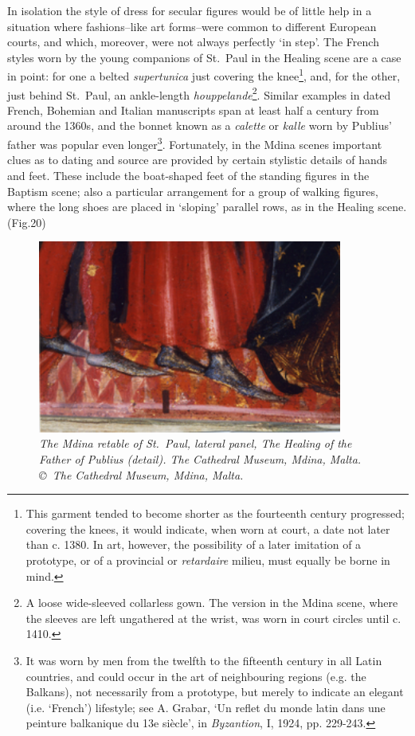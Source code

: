 \documentclass[a4paper,12pt]{article}
\begin{document}
In isolation the style of dress for secular figures would be of little
help in a situation where fashions--like art forms--were common to
different European courts, and which, moreover, were not always
perfectly `in step'. The French styles worn by the young companions of
St.~Paul in the Healing scene are a case in point: for one a belted
\textit{supertunica} just covering the knee\footnote{This garment
tended to become shorter as the fourteenth century progressed;
covering the knees, it would indicate, when worn at court, a date not
later than c. 1380. In art, however, the possibility of a later
imitation of a prototype, or of a provincial or \textit{retardaire}
milieu, must equally be borne in mind.}, and, for the other, just
behind St.~Paul, an ankle-length \textit{houppelande}\footnote{A loose
wide-sleeved collarless gown. The version in the Mdina scene, where
the sleeves are left ungathered at the wrist, was worn in court
circles until c. 1410.}. Similar examples in dated French, Bohemian
and Italian manuscripts span at least half a century from around the
1360s, and the bonnet known as a \textit{calette} or \textit{kalle}
worn by Publius' father was popular even longer\footnote{It was worn
by men from the twelfth to the fifteenth century in all Latin
countries, and could occur in the art of neighbouring regions
(e.g. the Balkans), not necessarily from a prototype, but merely to
indicate an elegant (i.e. `French') lifestyle; see A. Grabar, `Un
reflet du monde latin dans une peinture balkanique du 13e si\`ecle', in
\textit{Byzantion}, I, 1924, pp. 229-243.}. Fortunately, in the Mdina
scenes important clues as to dating and source are provided by certain
stylistic details of hands and feet. These include the boat-shaped
feet of the standing figures in the Baptism scene; also a particular
arrangement for a group of walking figures, where the long shoes are
placed in `sloping' parallel rows, as in the Healing scene. (Fig.20)
\begin{figure}[htbp]
\centering
\includegraphics[width=10cm]{pics/fig20.png}
\caption[The Mdina retable of St.~Paul, lateral panel, The Healing of the
Father of Publius (detail)]
{\it The Mdina retable of St.~Paul, lateral panel, The Healing of the
Father of Publius (detail).  
The Cathedral Museum, Mdina, Malta. \copyright\ The Cathedral Museum,
  Mdina, Malta.} 
\end{figure}
\end{document}
